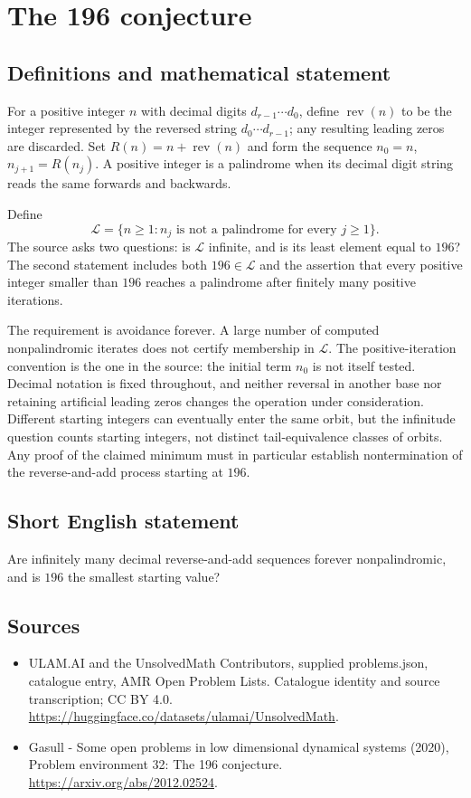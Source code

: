 \documentclass[11pt,a4paper]{article}
\begin{document}
\section*{The 196 conjecture}\label{statement}

\subsection{Definitions and mathematical statement}
For a positive integer $n$ with decimal digits $d_{r-1}\cdots d_0$, define
$\operatorname{rev}(n)$ to be the integer represented by the reversed
string $d_0\cdots d_{r-1}$; any resulting leading zeros are discarded.
Set $R(n)=n+\operatorname{rev}(n)$ and form the sequence
$n_0=n$, $n_{j+1}=R(n_j)$. A positive integer is a palindrome when its
decimal digit string reads the same forwards and backwards.

Define
\[
 \mathcal L=\{n\ge1:n_j\text{ is not a palindrome for every }j\ge1\}.
\]
The source asks two questions: is $\mathcal L$ infinite, and is its least
element equal to $196$? The second statement includes both
$196\in\mathcal L$ and the assertion that every positive integer smaller
than $196$ reaches a palindrome after finitely many positive iterations.

The requirement is avoidance forever. A large number of computed
nonpalindromic iterates does not certify membership in $\mathcal L$.
The positive-iteration convention is the one in the source: the initial
term $n_0$ is not itself tested. Decimal notation is fixed throughout,
and neither reversal in another base nor retaining artificial leading
zeros changes the operation under consideration. Different starting
integers can eventually enter the same orbit, but the infinitude question
counts starting integers, not distinct tail-equivalence classes of
orbits. Any proof of the claimed minimum must in particular establish
nontermination of the reverse-and-add process starting at $196$.
\subsection{Short English statement}
Are infinitely many decimal reverse-and-add sequences forever nonpalindromic, and is $196$ the smallest starting value?
\subsection{Sources}
\begin{itemize}
\item[S1] ULAM.AI and the UnsolvedMath Contributors, supplied problems.json, catalogue entry, AMR Open Problem Lists. Catalogue identity and source transcription; CC BY 4.0.
\url{https://huggingface.co/datasets/ulamai/UnsolvedMath}.
\item[S2] Gasull - Some open problems in low dimensional dynamical systems (2020), Problem environment 32: The 196 conjecture. 
\url{https://arxiv.org/abs/2012.02524}.
\end{itemize}
\end{document}
